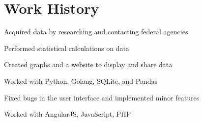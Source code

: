 \documentclass[letterpaper]{resume}
\begin{document}
\section{Work History}

\begin{compactitem}
\item Acquired data by researching and contacting federal agencies
\item Performed statistical calculations on data
\item Created graphs and a website to display and share data
\item Worked with Python, Golang, SQLite, and Pandas
\end{compactitem}

\begin{compactitem}
\item Fixed bugs in the user interface and implemented minor features
\item Worked with AngularJS, JavaScript, PHP
\end{compactitem}
\end{document}
